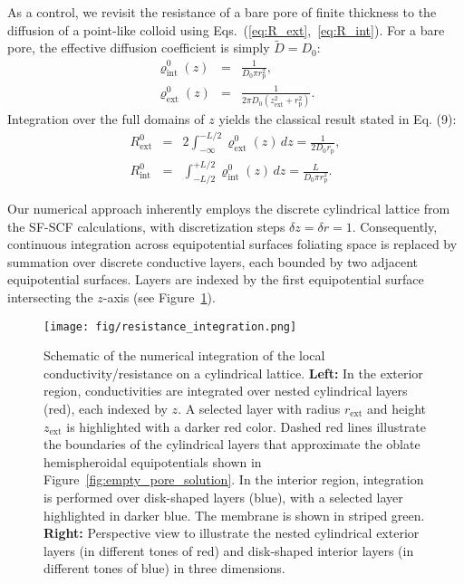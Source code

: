 \documentclass[10pt, a4paper, twocolumn]{article}
\begin{document}
As a control, we revisit the resistance of a bare pore of finite thickness to the diffusion of a point-like colloid using Eqs.~(\ref{eq:R_ext},~\ref{eq:R_int}).
For a bare pore, the effective diffusion coefficient is simply $\tilde{D} = D_0$:
\begin{eqnarray}
    \varrho^{0}_{\text{int}}(z) &=& \frac{1}{D_0 \pi r_{\text{p}}^2},\\[4pt]
    \varrho^{0}_{\text{ext}}(z) &=& \frac{1}{2\pi D_0\left(z_{\text{ext}}^2 + r_{\text{p}}^2\right)}.
\end{eqnarray}
Integration over the full domains of $z$ yields the classical result \cite{Brunn1984} stated in Eq. (9):
\begin{eqnarray}
    \label{eq:r_empty}
    R_{\text{ext}}^{0} &=& 2 \int_{-\infty}^{-L/2} \varrho_{\text{ext}}^{0}(z)\,dz = \frac{1}{2 D_0 r_{\text{p}}},\\[4pt]
    R_{\text{int}}^{0} &=& \int_{-L/2}^{+L/2} \varrho_{\text{int}}^{0}(z)\,dz = \frac{L}{D_0 \pi r_{\text{p}}^2}.
\end{eqnarray}

\bigskip

Our numerical approach inherently employs the discrete cylindrical lattice from the SF-SCF calculations, with discretization steps $\delta z = \delta r = 1$.
Consequently, continuous integration across equipotential surfaces foliating space is replaced by summation over discrete conductive layers, each bounded by two adjacent equipotential surfaces. 
Layers are indexed by the first equipotential surface intersecting the $z$-axis (see Figure~\ref{fig:integration_scheme}).

\begin{figure}[]
    \centering
    \texttt{[image: fig/resistance\_integration.png]}
    \caption{
        Schematic of the numerical integration of the local conductivity/resistance on a cylindrical lattice.    
        \textbf{Left:}
        In the exterior region, conductivities are integrated over nested cylindrical layers (red), each indexed by $z$.
        A selected layer with radius $r_{\text{ext}}$ and height $z_{\text{ext}}$ is highlighted with a darker red color.
        Dashed red lines illustrate the boundaries of the cylindrical layers that approximate the oblate hemispheroidal equipotentials shown in Figure~\ref{fig:empty_pore_solution}.
        In the interior region, integration is performed over disk-shaped layers (blue), with a selected layer highlighted in darker blue.
        The membrane is shown in striped green.
        \textbf{Right:}
        Perspective view to illustrate the nested cylindrical exterior layers (in different tones of red) and disk-shaped interior layers (in different tones of blue) in three dimensions.
    }
    \label{fig:integration_scheme}
\end{figure}
\end{document}
